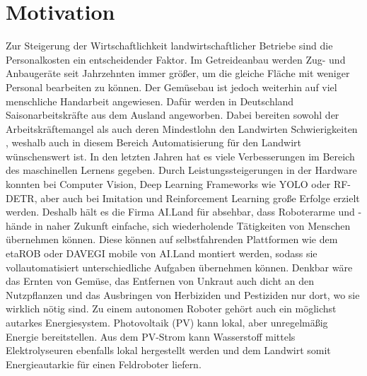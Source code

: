 \section{Motivation}
Zur Steigerung der Wirtschaftlichkeit landwirtschaftlicher Betriebe sind die Personalkosten ein entscheidender Faktor. Im Getreideanbau werden Zug- und Anbaugeräte seit Jahrzehnten immer größer, um die gleiche Fläche mit weniger Personal bearbeiten zu können. Der Gemüsebau ist jedoch weiterhin auf viel menschliche Handarbeit angewiesen. Dafür werden in Deutschland Saisonarbeitskräfte aus dem Ausland angeworben. Dabei bereiten sowohl der Arbeitskräftemangel als auch deren Mindestlohn den Landwirten Schwierigkeiten \cite{arbeitskräfte}, weshalb auch in diesem Bereich Automatisierung für den Landwirt wünschenswert ist. In den letzten Jahren hat es viele Verbesserungen im Bereich des maschinellen Lernens gegeben. Durch Leistungssteigerungen in der Hardware konnten bei Computer Vision, Deep Learning Frameworks wie YOLO oder RF-DETR, aber auch bei Imitation und Reinforcement Learning große Erfolge erzielt werden. Deshalb hält es die Firma AI.Land für absehbar, dass Roboterarme und -hände in naher Zukunft einfache, sich wiederholende Tätigkeiten von Menschen übernehmen können. Diese können auf selbstfahrenden Plattformen wie dem etaROB oder DAVEGI mobile von AI.Land montiert werden, sodass sie vollautomatisiert unterschiedliche Aufgaben übernehmen können. Denkbar wäre das Ernten von Gemüse, das Entfernen von Unkraut auch dicht an den Nutzpflanzen und das Ausbringen von Herbiziden und Pestiziden nur dort, wo sie wirklich nötig sind. Zu einem autonomen Roboter gehört auch ein möglichst autarkes Energiesystem. Photovoltaik (PV) kann lokal, aber unregelmäßig Energie bereitstellen. Aus dem PV-Strom kann Wasserstoff mittels Elektrolyseuren ebenfalls lokal hergestellt werden und dem Landwirt somit Energieautarkie für einen Feldroboter liefern. \\ 

